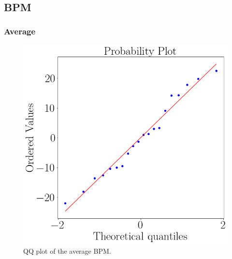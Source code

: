 \subsection{BPM}
    \subsubsection{Average}
        \begin{figure}[!htb]
            \begin{minipage}{0.45\linewidth}
                \centering
                \includegraphics[width = \linewidth]{Resultados/ECG/Figuras/png/qqplot_bpm.png}
                \caption{QQ plot of the average BPM.}
                \label{fig:qqplot_bpm_average}
            \end{minipage}
            \begin{minipage}{0.1\linewidth}
                \hfill
            \end{minipage}
            \begin{minipage}{0.45\linewidth}
                \centering

\end{minipage}
\end{figure}
